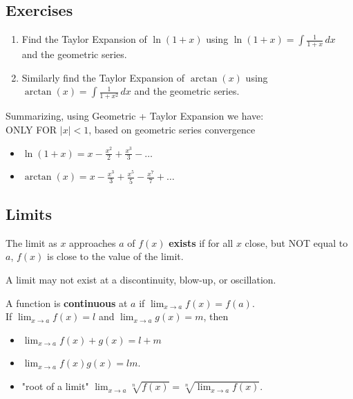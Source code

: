 \documentclass[a4paper, 12pt]{article}
\newcommand{\bt}[1]{\textbf{#1}} %
\newcommand{\green}[1]{\textcolor{javagreen}{#1}} %
\begin{document}
\subsection*{\green{Exercises}}
\begin{enumerate}
    \item Find the Taylor Expansion of $\ln(1+x)$ using $\ln(1+x) = \int \frac{1}{1+x} \, dx$ and the geometric series.

    \item Similarly find the Taylor Expansion of $\arctan(x)$ using 
    $\arctan(x) = \int \frac{1}{1+x^2} \,dx$ and the geometric series.
\end{enumerate}

Summarizing, using Geometric + Taylor Expansion we have: \\
ONLY FOR $|x|<1$, based on geometric series convergence
\begin{itemize}
    \item $\displaystyle \ln(1+x) = x - \frac{x^2}{2} + \frac{x^3}{3} - \dots$ 
    \item $\displaystyle \arctan(x) = x - \frac{x^3}{3} + \frac{x^5}{5} -
    \frac{x^7}{7} + \dots$ 
\end{itemize}



\subsection{Limits}

The limit as $x$ approaches $a$ of $f(x)$ \bt{exists} if for all $x$ close, but NOT equal to $a$, $f(x)$ is close to the value of the limit.

A limit may not exist at a discontinuity, blow-up, or oscillation.

A function is \bt{continuous} at $a$ if $\lim_{x \rightarrow a} f(x) = f(a)$.\\

If $\lim_{x \rightarrow a} f(x) = l$ and $\lim_{x \rightarrow a} g(x) = m$, then
\begin{itemize}
    \item $\displaystyle \lim_{x \rightarrow a}f(x) + g(x) = l + m$
    \item $\displaystyle \lim_{x \rightarrow a} f(x)g(x) = lm.$
    \item "root of a limit" $\displaystyle \lim_{x \rightarrow a} \sqrt[n]{f(x)} 
    = \sqrt[n]{\lim_{x \rightarrow a} f(x)}$.
\end{itemize}
\end{document}
